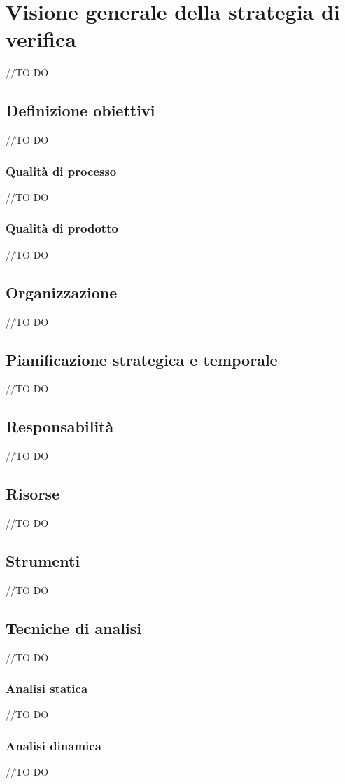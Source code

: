 \documentclass[12pt,a4paper]{article}
\begin{document}
\section{Visione generale della strategia di verifica}
//TO DO \AB
\subsection{Definizione obiettivi}
//TO DO \AB
\subsubsection{Qualità di processo}
//TO DO \AB
\subsubsection{Qualità di prodotto}
//TO DO \AB
\subsection{Organizzazione}
//TO DO \AB
\subsection{Pianificazione strategica e temporale}
//TO DO \AB
\subsection{Responsabilità}
//TO DO \AB
\subsection{Risorse}
//TO DO \AB
\subsection{Strumenti}
//TO DO \AB
\subsection{Tecniche di analisi}\label{analisi}
//TO DO \AB
\subsubsection{Analisi statica}
//TO DO \AVI
\subsubsection{ Analisi dinamica}
//TO DO \AVI
\end{document}
